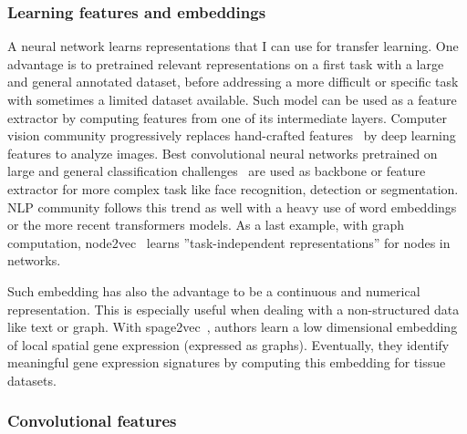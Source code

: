 \subsubsection{Learning features and embeddings}

A neural network learns representations that I can use for transfer learning.
One advantage is to pretrained relevant representations on a first task with a large and general annotated dataset, before addressing a more difficult or specific task with sometimes a limited dataset available.
Such model can be used as a feature extractor by computing features from one of its intermediate layers.
Computer vision community progressively replaces hand-crafted features~\cite{Lowe_1999,Bay_2006} by deep learning features to analyze images.
Best convolutional neural networks pretrained on large and general classification challenges~\cite{He_2016_CVPR,Szegedy_2016_CVPR,Tan_2019,Huang_2017_CVPR} are used as backbone or feature extractor for more complex task like face recognition, detection or segmentation.
NLP community follows this trend as well with a heavy use of word embeddings~\cite{Mikolov_2013,Joulin_2016} or the more recent transformers models.
As a last example, with graph computation, node2vec~\cite{Grover_2016} learns ''task-independent representations'' for nodes in networks.

Such embedding has also the advantage to be a continuous and numerical representation.
This is especially useful when dealing with a non-structured data like text or graph.
With spage2vec~\cite{Partel_2021}, authors learn a low dimensional embedding of local spatial gene expression (expressed as graphs).
Eventually, they identify meaningful gene expression signatures by computing this embedding for tissue datasets.

\subsubsection{Convolutional features}

